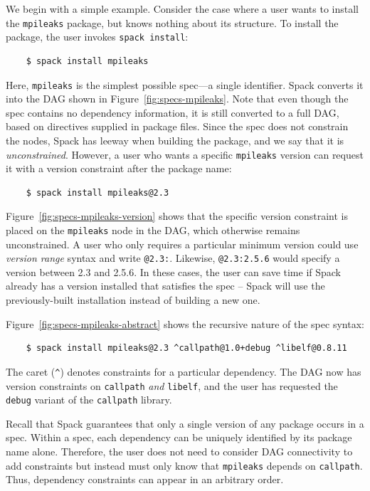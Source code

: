 We begin with a simple example.
Consider the case where a user wants to install the {\tt mpileaks} package, but knows
nothing about its structure.  To install the package, the user invokes {\tt spack install}:
%
\begin{verbatim}
    $ spack install mpileaks
\end{verbatim}
%
Here, {\tt mpileaks} is the simplest possible spec---a single identifier.
Spack converts it into the DAG shown in Figure~\ref{fig:specs-mpileaks}.
Note that even though the spec contains no dependency information, it is still
converted to a full DAG, based on directives supplied in package files. Since
the spec does not constrain the nodes, Spack has leeway when building the
package, and we say that it is {\it unconstrained}.
%
However, a user who wants a specific {\tt mpileaks} version can
request it with a version constraint after the package name:
%
\begin{verbatim}
    $ spack install mpileaks@2.3
\end{verbatim}
%
Figure~\ref{fig:specs-mpileaks-version} shows that the specific version
constraint is placed on the {\tt mpileaks} node in the DAG, which otherwise
remains unconstrained.
A user who only requires a particular minimum version could use
{\it version range} syntax
and write {\tt @2.3:}.  Likewise, {\tt @2.3:2.5.6} would specify a
version between 2.3 and 2.5.6. In these cases, the user can save time if
Spack already has a version installed that satisfies the spec -- Spack will use
the previously-built installation instead of building a new one.

Figure~\ref{fig:specs-mpileaks-abstract} shows the recursive nature of the spec syntax:
%
\begin{verbatim}
    $ spack install mpileaks@2.3 ^callpath@1.0+debug ^libelf@0.8.11
\end{verbatim}
%
The caret (\verb|^|) denotes constraints for a particular dependency. The DAG
now has version constraints on {\tt callpath} {\it and} {\tt libelf},
and the user has requested the {\tt debug} variant of the {\tt callpath} library.

Recall that Spack guarantees that only a single version of any package occurs
in a spec.  Within a spec, each dependency can be uniquely
identified by its package name alone.  Therefore, the user does not need to consider
DAG connectivity to add constraints but instead must only know that
{\tt mpileaks} depends on {\tt callpath}.
Thus, dependency constraints can appear in an arbitrary order.

